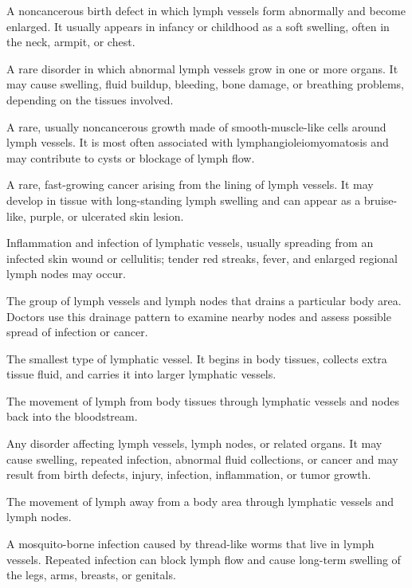 A noncancerous birth defect in which lymph vessels form abnormally and become enlarged. It usually appears in infancy or childhood as a soft swelling, often in the neck, armpit, or chest.

 A rare disorder in which abnormal lymph vessels grow in one or more organs. It may cause swelling, fluid buildup, bleeding, bone damage, or breathing problems, depending on the tissues involved.

 A rare, usually noncancerous growth made of smooth-muscle-like cells around lymph vessels. It is most often associated with lymphangioleiomyomatosis and may contribute to cysts or blockage of lymph flow.

 A rare, fast-growing cancer arising from the lining of lymph vessels. It may develop in tissue with long-standing lymph swelling and can appear as a bruise-like, purple, or ulcerated skin lesion.

 Inflammation and infection of lymphatic vessels, usually spreading from an infected skin wound or cellulitis; tender red streaks, fever, and enlarged regional lymph nodes may occur.

 The group of lymph vessels and lymph nodes that drains a particular body area. Doctors use this drainage pattern to examine nearby nodes and assess possible spread of infection or cancer.

 The smallest type of lymphatic vessel. It begins in body tissues, collects extra tissue fluid, and carries it into larger lymphatic vessels.

 The movement of lymph from body tissues through lymphatic vessels and nodes back into the bloodstream.

 Any disorder affecting lymph vessels, lymph nodes, or related organs. It may cause swelling, repeated infection, abnormal fluid collections, or cancer and may result from birth defects, injury, infection, inflammation, or tumor growth.

 The movement of lymph away from a body area through lymphatic vessels and lymph nodes.

 A mosquito-borne infection caused by thread-like worms that live in lymph vessels. Repeated infection can block lymph flow and cause long-term swelling of the legs, arms, breasts, or genitals.

